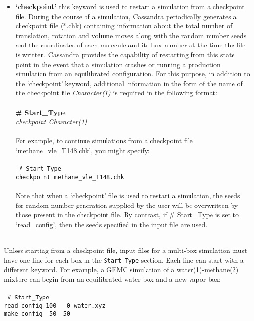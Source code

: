 \begin{itemize}
\item \textbf{`checkpoint'} this keyword is used to restart a simulation from a checkpoint file.
During the course of a simulation, Cassandra periodically generates a checkpoint file (*.chk)
 containing information about the total number of translation, rotation and volume moves along with the random number seeds and 
the coordinates of each molecule and its box number at the time the file is written. Cassandra provides
the capability of restarting from this state point in the event that a simulation crashes or 
running a production simulation from an equilibrated configuration. For this
purpose, in addition to the `checkpoint' keyword, additional information in the form of the name of 
the checkpoint file {\it Character(1)} is required in the following format: \\ \\
%
{\bf \# Start\_Type} \\
{\it checkpoint Character(1)} \\ \\
%
For example, to continue simulations from a checkpoint file `methane\_vle\_T148.chk', you might specify: \\ \\
%
\texttt{
\# Start\_Type \\
checkpoint methane\_vle\_T148.chk \\ } \\
%
Note that when a `checkpoint' file is used to restart a simulation, the seeds for random number generation supplied by the user
will be overwritten by those present in the checkpoint file. By contrast, if \# Start\_Type is set to `read\_config', 
then the seeds specified in the input file are used.  \\ \\
%
\end{itemize}
Unless starting from a checkpoint file, input files for a multi-box simulation must have one line for each box in the \texttt{Start\_Type} section. Each line can start with a different keyword. For example, a GEMC simulation of a water(1)-methane(2) mixture can begin from an equilibrated water box and a new vapor box: \\ \\
%
\texttt{
\# Start\_Type \\
read\_config 100 \ \ 0 water.xyz \\
make\_config \ 50 \ 50 \\}
%
%
%
